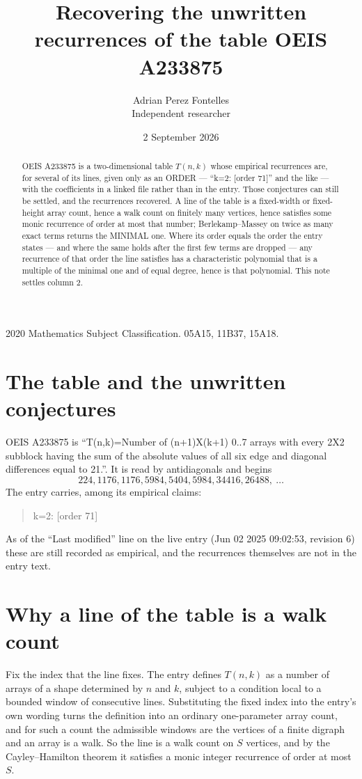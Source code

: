\documentclass[11pt,a4paper]{article}
\title{Recovering the unwritten recurrences of the table OEIS A233875}
\author{Adrian Perez Fontelles\\ \small Independent researcher}
\date{2 September 2026}
\theoremstyle{plain}
\theoremstyle{definition}
\begin{document}
\maketitle

\begin{abstract}
OEIS A233875 is a two-dimensional table $T(n,k)$ whose empirical recurrences are, for several of
its lines, given only as an ORDER --- ``k=2: [order 71]'' and the like --- with the
coefficients in a linked file rather than in the entry. Those conjectures can still be settled,
and the recurrences recovered. A line of the table is a fixed-width or fixed-height array
count, hence a walk count on finitely many vertices, hence satisfies some monic recurrence of
order at most that number; Berlekamp--Massey on twice as many exact terms returns the MINIMAL
one. Where its order equals the order the entry states --- and where the same holds after the
first few terms are dropped --- any recurrence of that order the line satisfies has a
characteristic polynomial that is a multiple of the minimal one and of equal degree, hence is
that polynomial. This note settles column 2.
\end{abstract}

\noindent\small 2020 Mathematics Subject Classification. 05A15, 11B37, 15A18.\normalsize

\section{The table and the unwritten conjectures}

OEIS A233875 is ``T(n,k)=Number of (n+1)X(k+1) 0..7 arrays with every 2X2 subblock having the sum of the absolute values of all six edge and diagonal differences equal to 21.''. It is read by antidiagonals and begins
\[
224, 1176, 1176, 5984, 5404, 5984, 34416, 26488,\ \dots
\]
The entry carries, among its empirical claims:
\begin{quote}\small
k=2: [order 71]
\end{quote}
As of the ``Last modified'' line on the live entry (Jun 02 2025 09:02:53, revision 6) these are still
recorded as empirical, and the recurrences themselves are not in the entry text.

\section{Why a line of the table is a walk count}

Fix the index that the line fixes. The entry defines $T(n,k)$ as a number of arrays of a shape
determined by $n$ and $k$, subject to a condition local to a bounded window of consecutive
lines. Substituting the fixed index into the entry's own wording turns the definition into an
ordinary one-parameter array count, and for such a count the admissible windows are the
vertices of a finite digraph and an array is a walk. So the line is a walk count on $S$
vertices, and by the Cayley--Hamilton theorem it satisfies a monic integer recurrence of order
at most $S$.
\end{document}
